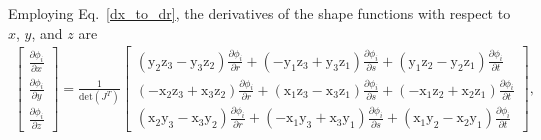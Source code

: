 Employing Eq.\ \eqref{dx_to_dr}, the derivatives of the shape functions with respect to $x$, $y$, and $z$ are
%
\begin{eqnarray}
%
\begin{bmatrix}
\frac{\partial \phi_i}{\partial x} \\
\frac{\partial \phi_i}{\partial y} \\
\frac{\partial \phi_i}{\partial z}
\end{bmatrix} = \frac{1}{\text{det}(J^T)}
%
\begin{bmatrix}
\left(\text{y}_2 \text{z}_3 - \text{y}_3 \text{z}_2\right) \frac{\partial \phi_i}{\partial r} + \left(-\text{y}_1 \text{z}_3 + \text{y}_3 \text{z}_1\right) \frac{\partial \phi_i}{\partial s} + \left(\text{y}_1 \text{z}_2 - \text{y}_2 \text{z}_1\right) \frac{\partial \phi_i}{\partial t} \\
%
\left(-\text{x}_2 \text{z}_3 + \text{x}_3\text{z}_2\right) \frac{\partial \phi_i}{\partial r} + \left(\text{x}_1\text{z}_3 - \text{x}_3 \text{z}_1\right) \frac{\partial \phi_i}{\partial s} + \left( -\text{x}_1 \text{z}_2 + \text{x}_2 \text{z}_1\right) \frac{\partial \phi_i}{\partial t} \\
%
\left(\text{x}_2 \text{y}_3 - \text{x}_3 \text{y}_2 \right) \frac{\partial \phi_i}{\partial r} + \left( -\text{x}_1 \text{y}_3 + \text{x}_3 \text{y}_1\right) \frac{\partial \phi_i}{\partial s} + \left( \text{x}_1 \text{y}_2 - \text{x}_2 \text{y}_1 \right) \frac{\partial \phi_i}{\partial t}
\end{bmatrix},
%
\end{eqnarray}
% 

